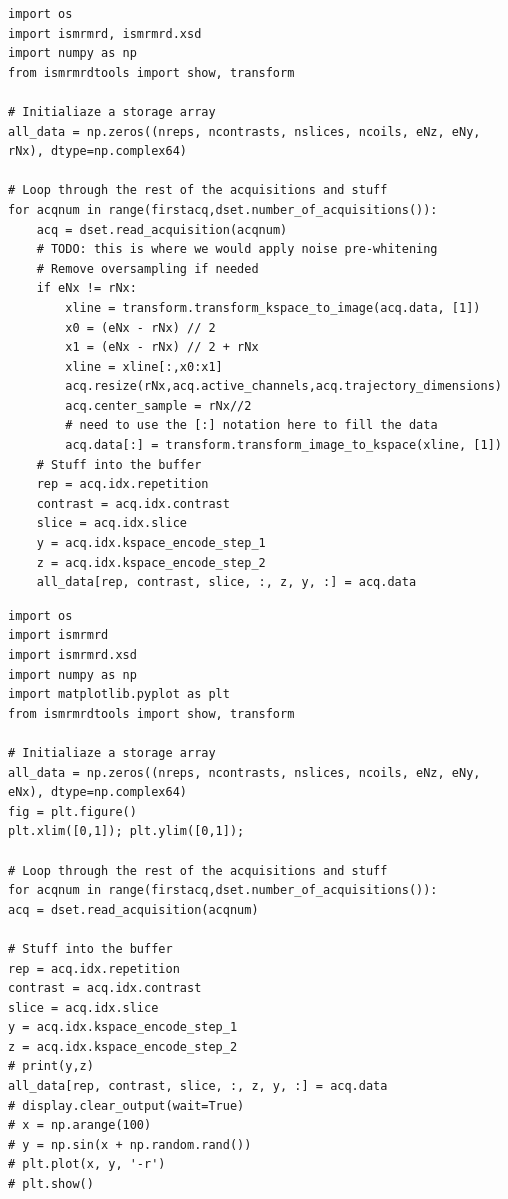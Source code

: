 \begin{latin}
\begin{lstlisting}
import os
import ismrmrd, ismrmrd.xsd
import numpy as np
from ismrmrdtools import show, transform

# Initialiaze a storage array
all_data = np.zeros((nreps, ncontrasts, nslices, ncoils, eNz, eNy, rNx), dtype=np.complex64)

# Loop through the rest of the acquisitions and stuff
for acqnum in range(firstacq,dset.number_of_acquisitions()):
	acq = dset.read_acquisition(acqnum)
	# TODO: this is where we would apply noise pre-whitening
	# Remove oversampling if needed
	if eNx != rNx:
		xline = transform.transform_kspace_to_image(acq.data, [1])
		x0 = (eNx - rNx) // 2
		x1 = (eNx - rNx) // 2 + rNx
		xline = xline[:,x0:x1]
		acq.resize(rNx,acq.active_channels,acq.trajectory_dimensions)
		acq.center_sample = rNx//2
		# need to use the [:] notation here to fill the data
		acq.data[:] = transform.transform_image_to_kspace(xline, [1])
	# Stuff into the buffer
	rep = acq.idx.repetition
	contrast = acq.idx.contrast
	slice = acq.idx.slice
	y = acq.idx.kspace_encode_step_1
	z = acq.idx.kspace_encode_step_2
	all_data[rep, contrast, slice, :, z, y, :] = acq.data
\end{lstlisting}
\end{latin}




\begin{latin}
\begin{lstlisting}
import os
import ismrmrd
import ismrmrd.xsd
import numpy as np
import matplotlib.pyplot as plt
from ismrmrdtools import show, transform

# Initialiaze a storage array
all_data = np.zeros((nreps, ncontrasts, nslices, ncoils, eNz, eNy, eNx), dtype=np.complex64)
fig = plt.figure()
plt.xlim([0,1]); plt.ylim([0,1]);

# Loop through the rest of the acquisitions and stuff
for acqnum in range(firstacq,dset.number_of_acquisitions()):
acq = dset.read_acquisition(acqnum)

# Stuff into the buffer
rep = acq.idx.repetition
contrast = acq.idx.contrast
slice = acq.idx.slice
y = acq.idx.kspace_encode_step_1
z = acq.idx.kspace_encode_step_2
# print(y,z)
all_data[rep, contrast, slice, :, z, y, :] = acq.data
# display.clear_output(wait=True)
# x = np.arange(100)
# y = np.sin(x + np.random.rand())
# plt.plot(x, y, '-r')
# plt.show()
\end{lstlisting}
\end{latin}




